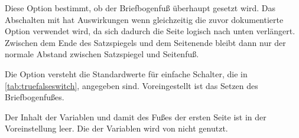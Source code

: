 \begin{Declaration}
\end{Declaration}
%
Diese Option bestimmt, ob der
Briefbogenfuß überhaupt gesetzt wird. Das Abschalten mit
 hat
Auswirkungen wenn gleichzeitig die zuvor dokumentierte Option
 verwendet wird, da sich
dadurch die Seite logisch nach unten verlängert. Zwischen dem Ende des
Satzspiegels und dem Seitenende bleibt dann nur der normale Abstand zwischen
Satzspiegel und Seitenfuß.

Die Option versteht die Standardwerte für einfache Schalter, die in
\autoref{tab:truefalseswitch},  angegeben
sind. Voreingestellt ist das Setzen des
Briefbogenfußes.%
\EndIndexGroup


\begin{Declaration}
\end{Declaration}%
%
\iffalse %
Der Fuß der ersten Seite ist in der Voreinstellung\textnote{Voreinstellung}
leer.  Es besteht jedoch die Möglichkeit, über den \PName{Inhalt} der
Variablen\ChangedAt{v3.08}{\Class{scrlttr2}} \Variable{firstfoot} einen neue
Festlegung zu treffen. %
\else %
Der Inhalt der Variablen
 und damit des Fußes der ersten Seite ist in der
Voreinstellung leer. %
\fi %
Die  der Variablen wird von \KOMAScript{} nicht genutzt.

